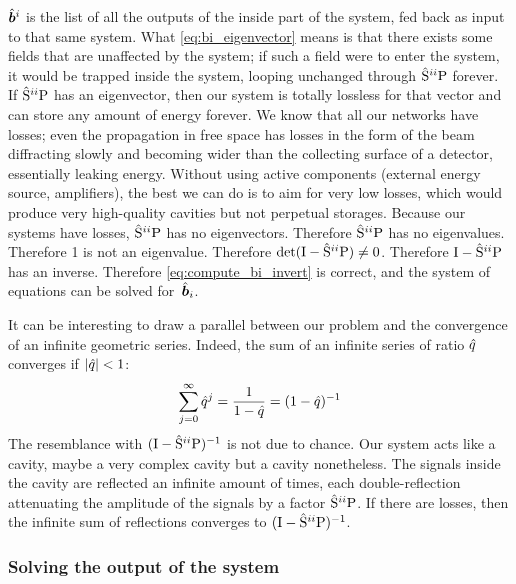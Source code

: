 $\hat{\bm{b}}^i$ is the list of all the outputs of the inside part of the system, fed back as input to that same system.
What \cref{eq:bi_eigenvector} means is that there exists some fields that are unaffected by the system; if such a field were to enter the system, it would be trapped inside the system, looping unchanged through $\hat{\mathrm{S}}^{ii}\mathrm{P}$ forever.
If $\hat{\mathrm{S}}^{ii}\mathrm{P}$ has an eigenvector, then our system is totally lossless for that vector and can store any amount of energy forever.
We know that all our networks have losses; even the propagation in free space has losses in the form of the beam diffracting slowly and becoming wider than the collecting surface of a detector, essentially leaking energy.
Without using active components (external energy source, amplifiers), the best we can do is to aim for very low losses, which would produce very high-quality cavities but not perpetual storages.
Because our systems have losses, $\hat{\mathrm{S}}^{ii}\mathrm{P}$ has no eigenvectors.
Therefore $\hat{\mathrm{S}}^{ii}\mathrm{P}$ has no eigenvalues.
Therefore 1 is not an eigenvalue.
Therefore $\det(\mathrm{I}-\hat{\mathrm{S}}^{ii}\mathrm{P}) \neq 0$.
Therefore $\mathrm{I}-\hat{\mathrm{S}}^{ii}\mathrm{P}$ has an inverse.
Therefore \cref{eq:compute_bi_invert} is correct, and the system of equations can be solved for~$\hat{\bm{b}}_i$.

It can be interesting to draw a parallel between our problem and the convergence of an infinite geometric series.
Indeed, the sum of an infinite series of ratio $\hat{q}$ converges if $\abs{\cp{q}} < 1$:
\begin{equation}
    \sum_{j=0}^\infty \hat{q}^j = \frac{1}{1-\hat{q}} = (1-\hat{q})^{-1}
\end{equation}
The resemblance with $(\mathrm{I} - \hat{\mathrm{S}}^{ii}\mathrm{P})^{-1}$ is not due to chance.
Our system acts like a cavity, maybe a very complex cavity but a cavity nonetheless.
The signals inside the cavity are reflected an infinite amount of times, each double-reflection attenuating the amplitude of the signals by a factor $\hat{\mathrm{S}}^{ii}\mathrm{P}$.
If there are losses, then the infinite sum of reflections converges to $(\mathrm{I} - \hat{\mathrm{S}}^{ii}\mathrm{P})^{-1}$.




\subsubsection{Solving the output of the system}

